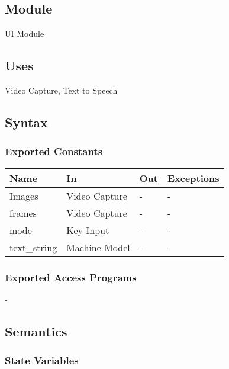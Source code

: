 \documentclass[12pt, titlepage]{article}
\begin{document}
\subsection{Module}

UI Module\\

\subsection{Uses}

Video Capture, Text to Speech\\

\subsection{Syntax}

\subsubsection{Exported Constants}

\begin{center}
\begin{tabular}{p{5cm} p{3cm} p{3cm} p{4cm}}
\hline
\textbf{Name} & \textbf{In} & \textbf{Out} & \textbf{Exceptions} \\
\hline
Images & Video Capture & - & - \\
\hline
frames & Video Capture & - & - \\
\hline
mode & Key Input & - & - \\
\hline
text\_string & Machine Model & - & - \\
\hline
\end{tabular}
\end{center}

\subsubsection{Exported Access Programs}
-

\subsection{Semantics}

\subsubsection{State Variables}
\end{document}
